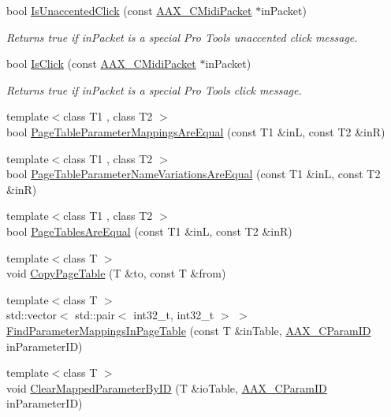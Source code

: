 \begin{DoxyCompactItemize}
bool \hyperlink{a00288_a4f915a56cb150638f036cb7ed33facd8}{Is\+Unaccented\+Click} (const \hyperlink{a00024}{A\+A\+X\+\_\+\+C\+Midi\+Packet} $\ast$in\+Packet)
\begin{DoxyCompactList}\small\item\em Returns true if {\ttfamily in\+Packet} is a special Pro Tools unaccented click message. \end{DoxyCompactList}\item 
bool \hyperlink{a00288_a8f9544e49b4473862e0c1382f6963ce7}{Is\+Click} (const \hyperlink{a00024}{A\+A\+X\+\_\+\+C\+Midi\+Packet} $\ast$in\+Packet)
\begin{DoxyCompactList}\small\item\em Returns true if {\ttfamily in\+Packet} is a special Pro Tools click message. \end{DoxyCompactList}\item 
{\footnotesize template$<$class T1 , class T2 $>$ }\\bool \hyperlink{a00288_a6615318d686a57585ba69565f8e6a99b}{Page\+Table\+Parameter\+Mappings\+Are\+Equal} (const T1 \&in\+L, const T2 \&in\+R)
\item 
{\footnotesize template$<$class T1 , class T2 $>$ }\\bool \hyperlink{a00288_a2e75756c486e5db4ffa91579bb486a6a}{Page\+Table\+Parameter\+Name\+Variations\+Are\+Equal} (const T1 \&in\+L, const T2 \&in\+R)
\item 
{\footnotesize template$<$class T1 , class T2 $>$ }\\bool \hyperlink{a00288_a315085bafc0ddf4e7043a69d070da2fb}{Page\+Tables\+Are\+Equal} (const T1 \&in\+L, const T2 \&in\+R)
\item 
{\footnotesize template$<$class T $>$ }\\void \hyperlink{a00288_a99fe28eb20cfcef49e99710060c5ebe0}{Copy\+Page\+Table} (T \&to, const T \&from)
\item 
{\footnotesize template$<$class T $>$ }\\std\+::vector$<$ std\+::pair$<$ int32\+\_\+t, int32\+\_\+t $>$ $>$ \hyperlink{a00288_ac87bacdbc6323ab3f099c16ed8b508be}{Find\+Parameter\+Mappings\+In\+Page\+Table} (const T \&in\+Table, \hyperlink{a00149_a1440c756fe5cb158b78193b2fc1780d1}{A\+A\+X\+\_\+\+C\+Param\+I\+D} in\+Parameter\+I\+D)
\item 
{\footnotesize template$<$class T $>$ }\\void \hyperlink{a00288_ae583643c21c696c4d094a500b4e6d77e}{Clear\+Mapped\+Parameter\+By\+I\+D} (T \&io\+Table, \hyperlink{a00149_a1440c756fe5cb158b78193b2fc1780d1}{A\+A\+X\+\_\+\+C\+Param\+I\+D} in\+Parameter\+I\+D)

\end{DoxyCompactItemize}
